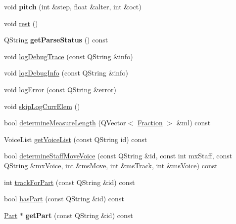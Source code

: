 \begin{DoxyCompactItemize}
void {\bfseries pitch} (int \&step, float \&alter, int \&oct)
\item 
void \hyperlink{class_ms_1_1_music_x_m_l_parser_pass1_acc3a6e719aed4b0d3f1cd4fc75b418bf}{rest} ()
\item 
\mbox{\label{class_ms_1_1_music_x_m_l_parser_pass1_a182a288f42f6a1e202a4a8c83452c09c}} 
Q\+String {\bfseries get\+Parse\+Status} () const
\item 
void \hyperlink{class_ms_1_1_music_x_m_l_parser_pass1_adeeb5d31ceb27d6a85d6ff843ca11512}{log\+Debug\+Trace} (const Q\+String \&info)
\item 
void \hyperlink{class_ms_1_1_music_x_m_l_parser_pass1_a0a350619dbe0953dc37376f2ce630c8f}{log\+Debug\+Info} (const Q\+String \&info)
\item 
void \hyperlink{class_ms_1_1_music_x_m_l_parser_pass1_a204f3b7acd0364a787806b53ae5ea663}{log\+Error} (const Q\+String \&error)
\item 
void \hyperlink{class_ms_1_1_music_x_m_l_parser_pass1_a82c648499fd4e880204c669a7ee3cc20}{skip\+Log\+Curr\+Elem} ()
\item 
bool \hyperlink{class_ms_1_1_music_x_m_l_parser_pass1_a2b8f3b411b5c0562b7c45c8f87bacf84}{determine\+Measure\+Length} (Q\+Vector$<$ \hyperlink{class_ms_1_1_fraction}{Fraction} $>$ \&ml) const
\item 
Voice\+List \hyperlink{class_ms_1_1_music_x_m_l_parser_pass1_ad7245a1bc923e434054c8300e793056c}{get\+Voice\+List} (const Q\+String id) const
\item 
bool \hyperlink{class_ms_1_1_music_x_m_l_parser_pass1_a818455585a8cfd20fea4c6a2131a33b0}{determine\+Staff\+Move\+Voice} (const Q\+String \&id, const int mx\+Staff, const Q\+String \&mx\+Voice, int \&ms\+Move, int \&ms\+Track, int \&ms\+Voice) const
\item 
int \hyperlink{class_ms_1_1_music_x_m_l_parser_pass1_abc6e2042bc02ff42b643730142f87202}{track\+For\+Part} (const Q\+String \&id) const
\item 
bool \hyperlink{class_ms_1_1_music_x_m_l_parser_pass1_a9570429eb776356d3f39df8201a98860}{has\+Part} (const Q\+String \&id) const
\item 
\mbox{\label{class_ms_1_1_music_x_m_l_parser_pass1_aa0cf2c789fc58bfa0a493b1e08560c8f}} 
\hyperlink{class_ms_1_1_part}{Part} $\ast$ {\bfseries get\+Part} (const Q\+String \&id) const
\item 

\end{DoxyCompactItemize}
